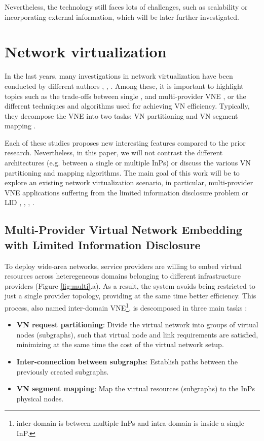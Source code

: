Nevertheless, the technology still faces lots of challenges, such as scalability or incorporating external information, which will be later further investigated.

\section{Network virtualization}

In the last years, many investigations in network virtualization have been conducted by different authors \citep{houidi2011virtual}, \citep{zhu2008cabernet}, \citep{chowdhury2009virtual}. Among these, it is important to highlight topics such as the trade-offs between single \citep{chowdhury2009virtual}, \citep{houidi2008distributed} and multi-provider VNE \citep{dietrich2017multi}, or the different techniques and algorithms used for achieving VN efficiency. Typically, they decompose the VNE into two tasks: VN partitioning and VN segment mapping \citep{fischer2013virtual}. 

Each of these studies proposes new interesting features compared to the prior research. Nevertheless, in this paper, we will not contrast the different architectures (e.g. between a single or multiple InPs) or discuss the various VN partitioning and mapping algorithms. The main goal of this work will be to explore an existing network virtualization scenario, in particular, multi-provider VNE applications suffering from the limited information disclosure problem or LID \citep{dietrich2017multi}, \citep{zaheer2010multi}, \citep{esposito2013general}, \citep{chowdhury2010polyvine}.

\subsection{Multi-Provider Virtual Network Embedding with Limited Information Disclosure}

To deploy wide-area networks, service providers are willing to embed virtual resources across heteregeneous domains belonging to different infrastructure providers (Figure \ref{fig:multi}.a). As a result, the system avoids being restricted to just a single provider topology, providing at the same time better efficiency. This process, also named inter-domain VNE\footnote{inter-domain is between multiple InPs and intra-domain is inside a single InP.}, is descomposed in three main tasks \citep{chowdhury2010polyvine}:

\begin{itemize}
	\item \textbf{VN request partitioning}: Divide the virtual network into groups of virtual nodes (subgraphs), such that virtual node and link requirements are satisfied, minimizing at the same time the cost of the virtual network setup.
		\item \textbf{Inter-connection between subgraphs}: Establish paths between the previously created subgraphs.
	\item \textbf{VN segment mapping}: Map the virtual resources (subgraphs) to the InPs physical nodes.
\end{itemize}

